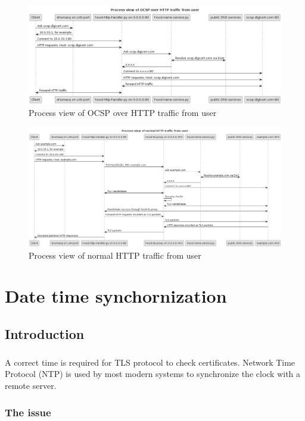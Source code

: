 \documentclass[mscthesis]{usiinfthesis}
\begin{document}
\begin{figure}[H]
  \includegraphics[width=\textheight, angle=90]{graphics/puml/process-ocsp-traffic.png}
  \caption{Process view of OCSP over HTTP traffic from user}
  \label{fig:ocsp-process-view}
\end{figure}

\begin{figure}[H]
  \includegraphics[width=\textheight, angle=90]{graphics/puml/process-http-traffic.png}
  \caption{Process view of normal HTTP traffic from user}
  \label{fig:http-process-view}
\end{figure}

\chapter{Date time synchornization}
\section{Introduction}
\paragraph{}
A correct time is required for TLS protocol to check certificates. Network Time Protocol (NTP) is used by most modern systems to synchronize the clock with a remote server.
\subsection{The issue}
\end{document}
